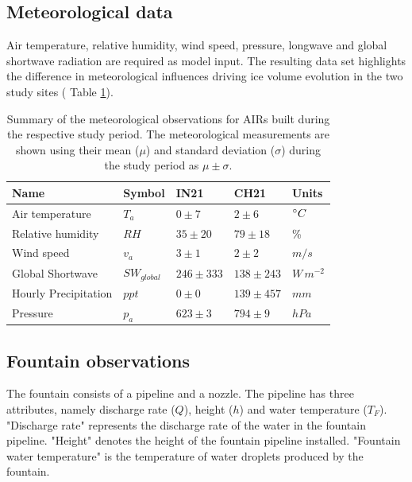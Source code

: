 \subsection{Meteorological data}

Air temperature, relative humidity, wind speed, pressure, longwave and global shortwave radiation are required
as model input.  The resulting data set highlights the difference in meteorological influences driving ice
volume evolution in the two study sites ( Table \ref{tab:Observations}).

\begin{table}
	\centering
	\caption{Summary of the meteorological observations for \ac{AIRs} built during the respective study period.
		The meteorological measurements are shown using their mean ($\mu$) and standard deviation ($\sigma$) during the study
		period as $\mu \pm \sigma$. }

	\label{tab:Observations}
	\begin{tabular}{|lllll|}
		\hline
		\textbf{Name}        & \textbf{Symbol} & \textbf{IN21} & \textbf{CH21} & \textbf{Units} \\ \hline
		Air temperature      & $T_a    $       & $0 \pm 7$     & $2 \pm 6$     & $^{\circ} C$    \\
		Relative humidity    & $RH     $       & $35 \pm 20$   & $79 \pm 18$   & \%             \\
		Wind speed           & $v_a        $   & $3 \pm 1$     & $2 \pm 2$     & $m/s$          \\
		Global Shortwave     & $SW_{global} $  & $246 \pm 333$ & $138 \pm 243$  & $W\,m^{-2}$    \\
		Hourly Precipitation & $ppt        $   & $0 \pm 0$     & $139 \pm 457$ & $mm$           \\
		Pressure             & $p_a         $  & $623 \pm 3$   & $794 \pm 9$   & $hPa$          \\\hline
	\end{tabular}
\end{table}

\subsection{Fountain observations}

The fountain consists of a pipeline and a nozzle. The pipeline has three attributes, namely discharge rate
($Q$), height ($h$) and water temperature ($T_F$). "Discharge rate" represents the discharge rate of the water in
the fountain pipeline. "Height" denotes the height of the fountain pipeline installed. "Fountain water temperature"
is the temperature of water droplets produced by the fountain.


